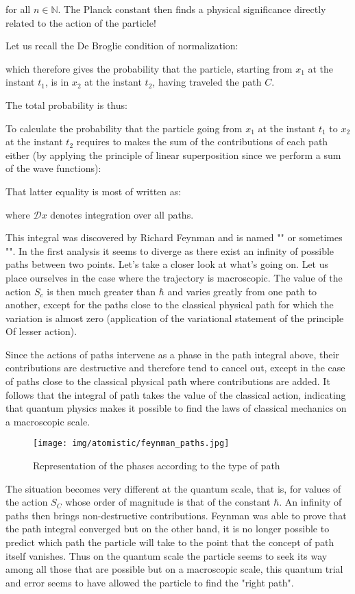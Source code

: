 	for all $n\in\mathbb{N}$. The Planck constant then finds a physical significance directly related to the action of the particle!

	Let us recall the De Broglie condition of normalization:
	
	which therefore gives the probability that the particle, starting from $x_1$ at the instant $t_1$, is in $x_2$ at the instant $t_2$, having traveled the path $C$.

	The total probability is thus:
	
	To calculate the probability that the particle going from $x_1$ at the instant $t_1$ to $x_2$ at the instant $t_2$ requires to makes the sum of the contributions of each path either (by applying the principle of linear superposition since we perform a sum of the wave functions):
	
	That latter equality is most of written as:
	
	where $\mathcal{D}x$ denotes integration over all paths.
	
	This integral was discovered by Richard Feynman and is named "" or sometimes "". In the first analysis it seems to diverge as there exist an infinity of possible paths between two points. Let's take a closer look at what's going on. Let us place ourselves in the case where the trajectory is macroscopic. The value of the action $S_c$ is then much greater than $\hbar$ and varies greatly from one path to another, except for the paths close to the classical physical path for which the variation is almost zero (application of the variational statement of the principle Of lesser action).

	Since the actions of paths intervene as a phase in the path integral above, their contributions are destructive and therefore tend to cancel out, except in the case of paths close to the classical physical path where contributions are added. It follows that the integral of path takes the value of the classical action, indicating that quantum physics makes it possible to find the laws of classical mechanics on a macroscopic scale.
	\begin{figure}[H]
		\centering
		\texttt{[image: img/atomistic/feynman\_paths.jpg]}	
		\caption{Representation of the phases according to the type of path}
	\end{figure}
	The situation becomes very different at the quantum scale, that is, for values of the action $S_C$ whose order of magnitude is that of the constant $\hbar$. An infinity of paths then brings non-destructive contributions. Feynman was able to prove that the path integral converged but on the other hand, it is no longer possible to predict which path the particle will take to the point that the concept of path itself vanishes. Thus on the quantum scale the particle seems to seek its way among all those that are possible but on a macroscopic scale, this quantum trial and error seems to have allowed the particle to find the "right path".

